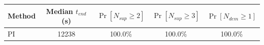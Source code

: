 \begin{tabular}{lcccc}
\toprule
Method & Median $t_{end}$ (s) & $\Pr[N_{sup}\ge2]$ & $\Pr[N_{sup}\ge3]$ & $\Pr[N_{dem}\ge1]$\\
\midrule
PI & 12238 & 100.0\% & 100.0\% & 100.0\%\\
\bottomrule
\end{tabular}